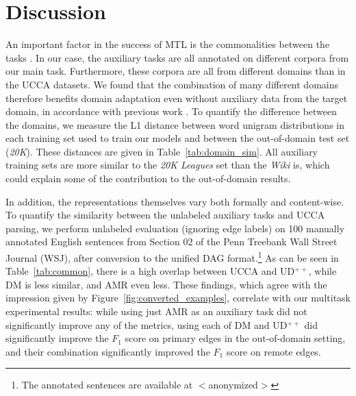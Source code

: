 \documentclass[11pt,a4paper]{article}
\begin{document}
\section{Discussion}\label{sec:discussion}

An important factor in the success of MTL is the commonalities between the tasks
\cite{E17-2026,E17-1005}.
In our case, the auxiliary tasks are all annotated on different corpora from our main task.
Furthermore, these corpora are all from different domains than in the UCCA datasets.
We found that the combination of many different domains therefore benefits domain
adaptation even without auxiliary data from the target domain,
in accordance with previous work \cite{Finkel2009JointPA}.
To quantify the difference between the domains, we measure the L1 distance between word unigram
distributions in each training set used to train our models \cite{Plank2011EffectiveMO}
and between the out-of-domain test set (\textit{20K}).
These distances are given in Table~\ref{tab:domain_sim}.
All auxiliary training sets are more similar to the \textit{20K Leagues} set than the \textit{Wiki}
is, which could explain some of the contribution to the out-of-domain results.

In addition, the representations themselves vary both formally and content-wise.
To quantify the similarity between the unlabeled auxiliary tasks and UCCA parsing,
we perform unlabeled evaluation (ignoring edge labels)
on 100 manually annotated English sentences from
Section 02 of the Penn Treebank Wall Street Journal (WSJ),
after conversion to the unified DAG format.\footnote{The annotated
sentences are available at $<$anonymized$>$}
As can be seen in Table~\ref{tab:common}, there is a high overlap between
UCCA and UD$^{++}$, while DM is less similar, and AMR even less.
These findings, which agree with the impression given by Figure~\ref{fig:converted_examples},
correlate with our multitask experimental results:
while using just AMR as an auxiliary task did not significantly improve any of the metrics,
using each of DM and UD$^{++}$ did significantly improve the $F_1$ score on primary edges in the
out-of-domain setting, and their combination significantly improved the $F_1$ score on remote edges.
\end{document}
